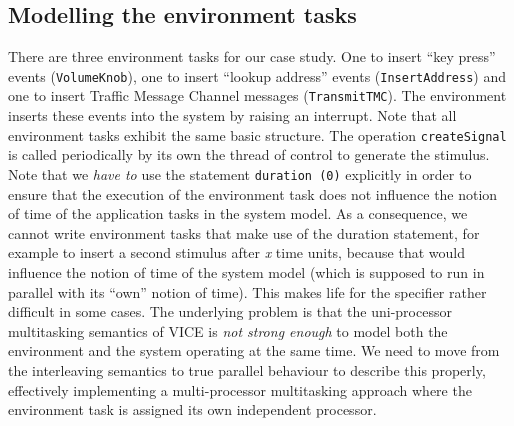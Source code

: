 

\subsection{Modelling the environment tasks}

There are three environment tasks for our case study. One to insert ``key
press'' events (\verb+VolumeKnob+), one to insert ``lookup address'' events
(\verb+InsertAddress+) and one to insert Traffic Message Channel messages
(\verb+TransmitTMC+). The environment inserts these events into the system
by raising an interrupt. Note that all environment tasks exhibit the same
basic structure. The operation \verb+createSignal+ is called periodically
by its own the thread of control to generate the stimulus. Note that we
\textit{have to} use the statement \verb+duration (0)+ explicitly in order
to ensure that the execution of the environment task does not influence
the notion of time of the application tasks in the system model. As a
consequence, we cannot write environment tasks that make use of the
duration statement, for example to insert a second stimulus after
\textit{x} time units, because that would influence the notion of time
of the system model (which is supposed to run in parallel with its ``own''
notion of time). This makes life for the specifier rather difficult in
some cases. The underlying problem is that the uni-processor multitasking
semantics of VICE is \textit{not strong enough} to model both the environment
and the system operating at the same time. We need to move from the
interleaving semantics to true parallel behaviour to describe this properly,
effectively implementing a multi-processor multitasking approach where the
environment task is assigned its own independent processor. \\

